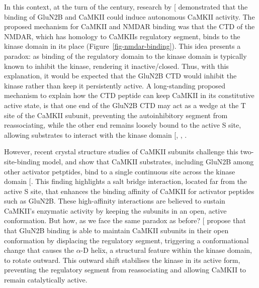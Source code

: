 \documentclass[
  11pt,
  letterpaper,
]{scrreprt}
\begin{document}
In this context, at the turn of the century, research by
{[}\citeproc{ref-bayer2001Interactiona}{127}{]} demonstrated that the
binding of GluN2B and CaMKII could induce autonomous CaMKII activity.
The proposed mechanism for CaMKII and NMDAR binding was that the CTD of
the NMDAR, which has homology to CaMKIIs regulatory segment, binds to
the kinase domain in its place (Figure~\ref{fig-nmdar-binding}). This
idea presents a paradox: as binding of the regulatory domain to the
kinase domain is typically known to inhibit the kinase, rendering it
inactive/closed. Thus, with this explanation, it would be expected that
the GluN2B CTD would inhibit the kinase rather than keep it persistently
active. A long-standing proposed mechanism to explain how the CTD
peptide can keep CaMKII in its constitutive active state, is that one
end of the GluN2B CTD may act as a wedge at the T site of the CaMKII
subunit, preventing the autoinhibitory segment from reassociating, while
the other end remains loosely bound to the active S site, allowing
substrates to interact with the kinase domain
{[},
,
\citeproc{ref-bayer2006Transitionb}{214}{]}.

However, recent crystal structure studies of CaMKII subunits challenge
this two-site-binding model, and show that CaMKII substrates, including
GluN2B among other activator petptides, bind to a single continuous site
across the kinase domain {[}\citeproc{ref-ozden2022CaMKIIb}{176}{]}.
This finding highlights a salt bridge interaction, located far from the
active S site, that enhances the binding affinity of CaMKII for
activator peptides such as GluN2B. These high-affinity interactions are
believed to sustain CaMKII's enzymatic activity by keeping the subunits
in an open, active conformation. But how, as we face the same paradox as
before? {[}\citeproc{ref-ozden2022CaMKIIb}{176}{]} propose that that
GluN2B binding is able to maintain CaMKII subunits in their open
conformation by displacing the regulatory segment, triggering a
conformational change that causes the \(\alpha\)-D helix, a structural
feature within the kinase domain, to rotate outward. This outward shift
stabilises the kinase in its active form, preventing the regulatory
segment from reassociating and allowing CaMKII to remain catalytically
active.
\end{document}
